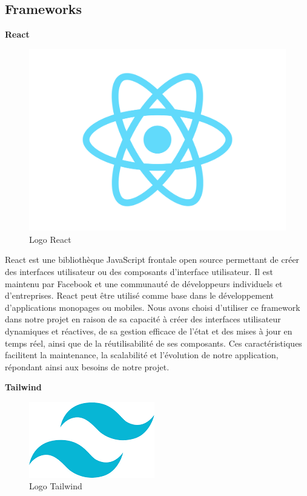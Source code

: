 \subsection{Frameworks}
\large
\textbf{React}
\begin{figure}[htbp]
   \centering
   \includegraphics[scale=0.1]{Images/react.png} 
   \caption{Logo React}
   \label{fig:react}
\end{figure}

React est une bibliothèque JavaScript frontale open source 
permettant de créer des interfaces utilisateur ou des composants 
d'interface utilisateur. Il est maintenu par Facebook et une 
communauté de développeurs individuels et d'entreprises. 
React peut être utilisé comme base dans le développement 
d'applications monopages ou mobiles. Nous avons choisi 
d'utiliser ce framework dans notre projet en raison de sa 
capacité à créer des interfaces utilisateur dynamiques et 
réactives, de sa gestion efficace de l'état et des mises à 
jour en temps réel, ainsi que de la réutilisabilité de ses 
composants\cite{React}. Ces caractéristiques facilitent la maintenance, 
la scalabilité et l'évolution de notre application, 
répondant ainsi aux besoins de notre projet.
\newline

\large
\textbf{Tailwind}
\begin{figure}[htbp]
   \centering
   \includegraphics[scale=0.5]{Images/tailwind.png} 
   \caption{Logo Tailwind}
   \label{fig:tailwind}
\end{figure}

